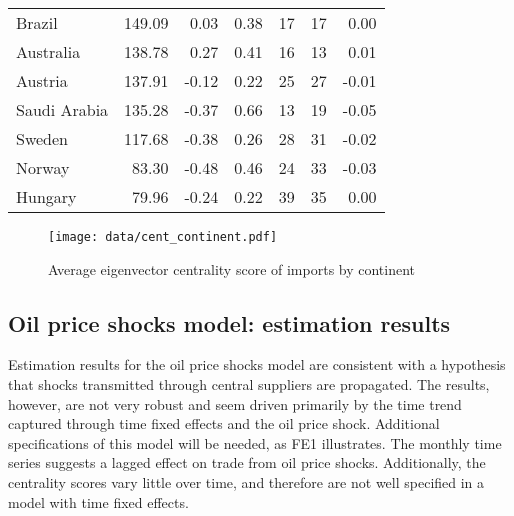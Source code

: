 \documentclass[10pt,letterpaper]{article}
\begin{document}
\begin{table}[h]
{\begin{tabular}{lrrrccr}
Brazil             & 149.09  & 0.03  & 0.38 & 17 & 17 & 0.00  \\
Australia          & 138.78  & 0.27  & 0.41 & 16 & 13 & 0.01  \\
Austria            & 137.91  & -0.12 & 0.22 & 25 & 27 & -0.01 \\
Saudi Arabia       & 135.28  & -0.37 & 0.66 & 13 & 19 & -0.05 \\
Sweden             & 117.68  & -0.38 & 0.26 & 28 & 31 & -0.02 \\
Norway             & 83.30    & -0.48 & 0.46 & 24 & 33 & -0.03 \\
Hungary            & 79.96   & -0.24 & 0.22 & 39 & 35 & 0.00 \\
\bottomrule
\end{tabular}}
\end{table}

\begin{figure}
  \caption{Average eigenvector centrality score of imports by continent}
  \centering
\texttt{[image: data/cent\_continent.pdf]} 
\end{figure}

\newpage


\subsection{Oil price shocks model: estimation results}

Estimation results for the oil price shocks model are consistent with a hypothesis that shocks transmitted through central suppliers are propagated. The results, however, are not very robust and seem driven primarily by the time trend captured through time fixed effects and the oil price shock. Additional specifications of this model will be needed, as FE1 illustrates. The monthly time series suggests a lagged effect on trade from oil price shocks. Additionally, the centrality scores vary little over time, and therefore are not well specified in a model with time fixed effects. 
\end{document}

